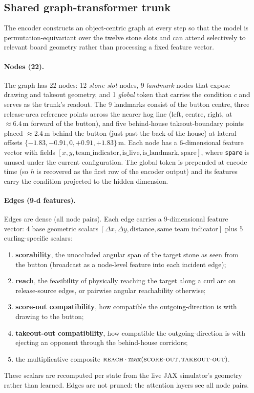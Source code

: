 \documentclass[11pt]{article}
\begin{document}
\subsection{Shared graph-transformer trunk}
\label{sec:trunk}
The encoder constructs an object-centric graph at every step so that the
model is permutation-equivariant over the twelve stone slots and can attend
selectively to relevant board geometry rather than processing a fixed
feature vector.

\paragraph{Nodes (22).} The graph has 22 nodes: 12 \emph{stone-slot} nodes,
9 \emph{landmark} nodes that expose drawing and takeout geometry, and 1
\emph{global} token that carries the condition $c$ and serves as the
trunk's readout. The 9 landmarks consist of the button centre, three
release-area reference points across the nearer hog line (left, centre,
right, at $\approx 6.4$\,m forward of the button), and five behind-house
takeout-boundary points placed $\approx 2.4$\,m behind the button (just
past the back of the house) at lateral offsets $\{-1.83, -0.91, 0, +0.91,
+1.83\}$\,m. Each node has a 6-dimensional feature vector with fields
$[x, y, \text{team\_indicator}, \text{is\_live}, \text{is\_landmark},
\text{spare}]$, where \texttt{spare} is unused under the current
configuration. The global token is prepended at encode time (so $h$ is
recovered as the first row of the encoder output) and its features carry
the condition projected to the hidden dimension.

\paragraph{Edges (9-d features).} Edges are dense (all node pairs). Each
edge carries a 9-dimensional feature vector: 4 base geometric scalars
$[\Delta x, \Delta y, \text{distance}, \text{same\_team\_indicator}]$ plus 5
curling-specific scalars:
\begin{enumerate}\setlength\itemsep{0pt}
\item[(1)] \textbf{scorability}, the unoccluded angular span of the target
stone as seen from the button (broadcast as a node-level feature into each
incident edge);
\item[(2)] \textbf{reach}, the feasibility of physically reaching the target
along a curl arc on release-source edges, or pairwise angular reachability
otherwise;
\item[(3)] \textbf{score-out compatibility}, how compatible the
outgoing-direction is with drawing to the button;
\item[(4)] \textbf{takeout-out compatibility}, how compatible the
outgoing-direction is with ejecting an opponent through the behind-house
corridors;
\item[(5)] the multiplicative composite
$\textsc{reach}\cdot\max(\textsc{score-out},\textsc{takeout-out})$.
\end{enumerate}
These scalars are recomputed per state from the live JAX simulator's
geometry rather than learned. Edges are not pruned: the attention layers
see all node pairs.
\end{document}
